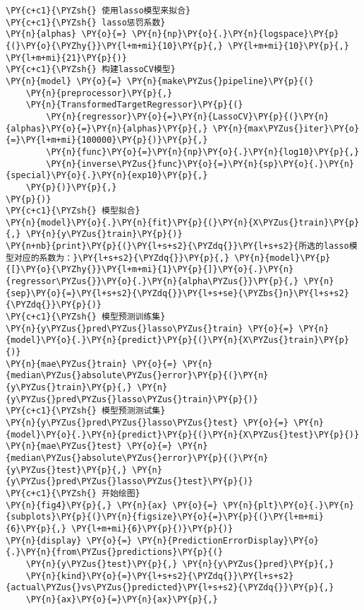 \begin{Verbatim}[commandchars=\\\{\}]
\PY{c+c1}{\PYZsh{} 使用lasso模型来拟合}
\PY{c+c1}{\PYZsh{} lasso惩罚系数}
\PY{n}{alphas} \PY{o}{=} \PY{n}{np}\PY{o}{.}\PY{n}{logspace}\PY{p}{(}\PY{o}{\PYZhy{}}\PY{l+m+mi}{10}\PY{p}{,} \PY{l+m+mi}{10}\PY{p}{,} \PY{l+m+mi}{21}\PY{p}{)}
\PY{c+c1}{\PYZsh{} 构建lassoCV模型}
\PY{n}{model} \PY{o}{=} \PY{n}{make\PYZus{}pipeline}\PY{p}{(}
    \PY{n}{preprocessor}\PY{p}{,}
    \PY{n}{TransformedTargetRegressor}\PY{p}{(}
        \PY{n}{regressor}\PY{o}{=}\PY{n}{LassoCV}\PY{p}{(}\PY{n}{alphas}\PY{o}{=}\PY{n}{alphas}\PY{p}{,} \PY{n}{max\PYZus{}iter}\PY{o}{=}\PY{l+m+mi}{100000}\PY{p}{)}\PY{p}{,}
        \PY{n}{func}\PY{o}{=}\PY{n}{np}\PY{o}{.}\PY{n}{log10}\PY{p}{,}
        \PY{n}{inverse\PYZus{}func}\PY{o}{=}\PY{n}{sp}\PY{o}{.}\PY{n}{special}\PY{o}{.}\PY{n}{exp10}\PY{p}{,}
    \PY{p}{)}\PY{p}{,}
\PY{p}{)}
\PY{c+c1}{\PYZsh{} 模型拟合}
\PY{n}{model}\PY{o}{.}\PY{n}{fit}\PY{p}{(}\PY{n}{X\PYZus{}train}\PY{p}{,} \PY{n}{y\PYZus{}train}\PY{p}{)}
\PY{n+nb}{print}\PY{p}{(}\PY{l+s+s2}{\PYZdq{}}\PY{l+s+s2}{所选的lasso模型对应的系数为：}\PY{l+s+s2}{\PYZdq{}}\PY{p}{,} \PY{n}{model}\PY{p}{[}\PY{o}{\PYZhy{}}\PY{l+m+mi}{1}\PY{p}{]}\PY{o}{.}\PY{n}{regressor\PYZus{}}\PY{o}{.}\PY{n}{alpha\PYZus{}}\PY{p}{,} \PY{n}{sep}\PY{o}{=}\PY{l+s+s2}{\PYZdq{}}\PY{l+s+se}{\PYZbs{}n}\PY{l+s+s2}{\PYZdq{}}\PY{p}{)}
\PY{c+c1}{\PYZsh{} 模型预测训练集}
\PY{n}{y\PYZus{}pred\PYZus{}lasso\PYZus{}train} \PY{o}{=} \PY{n}{model}\PY{o}{.}\PY{n}{predict}\PY{p}{(}\PY{n}{X\PYZus{}train}\PY{p}{)}
\PY{n}{mae\PYZus{}train} \PY{o}{=} \PY{n}{median\PYZus{}absolute\PYZus{}error}\PY{p}{(}\PY{n}{y\PYZus{}train}\PY{p}{,} \PY{n}{y\PYZus{}pred\PYZus{}lasso\PYZus{}train}\PY{p}{)}
\PY{c+c1}{\PYZsh{} 模型预测测试集}
\PY{n}{y\PYZus{}pred\PYZus{}lasso\PYZus{}test} \PY{o}{=} \PY{n}{model}\PY{o}{.}\PY{n}{predict}\PY{p}{(}\PY{n}{X\PYZus{}test}\PY{p}{)}
\PY{n}{mae\PYZus{}test} \PY{o}{=} \PY{n}{median\PYZus{}absolute\PYZus{}error}\PY{p}{(}\PY{n}{y\PYZus{}test}\PY{p}{,} \PY{n}{y\PYZus{}pred\PYZus{}lasso\PYZus{}test}\PY{p}{)}
\PY{c+c1}{\PYZsh{} 开始绘图}
\PY{n}{fig4}\PY{p}{,} \PY{n}{ax} \PY{o}{=} \PY{n}{plt}\PY{o}{.}\PY{n}{subplots}\PY{p}{(}\PY{n}{figsize}\PY{o}{=}\PY{p}{(}\PY{l+m+mi}{6}\PY{p}{,} \PY{l+m+mi}{6}\PY{p}{)}\PY{p}{)}
\PY{n}{display} \PY{o}{=} \PY{n}{PredictionErrorDisplay}\PY{o}{.}\PY{n}{from\PYZus{}predictions}\PY{p}{(}
    \PY{n}{y\PYZus{}test}\PY{p}{,} \PY{n}{y\PYZus{}pred}\PY{p}{,} 
    \PY{n}{kind}\PY{o}{=}\PY{l+s+s2}{\PYZdq{}}\PY{l+s+s2}{actual\PYZus{}vs\PYZus{}predicted}\PY{l+s+s2}{\PYZdq{}}\PY{p}{,} 
    \PY{n}{ax}\PY{o}{=}\PY{n}{ax}\PY{p}{,} 

\end{Verbatim}

